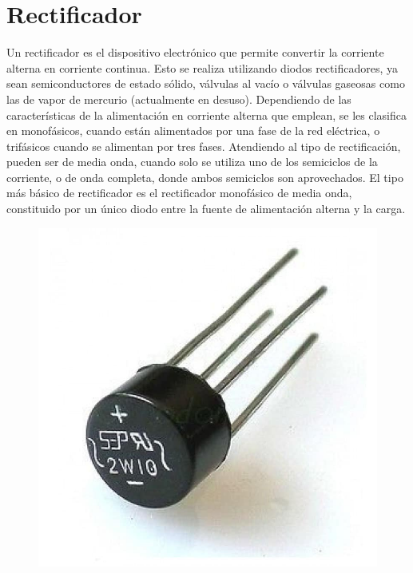\documentclass[a4paper,12pt]{report}
\begin{document}
\section{Rectificador}
Un rectificador es el dispositivo electrónico que permite convertir la corriente alterna en corriente continua. Esto se realiza utilizando diodos rectificadores, ya sean semiconductores de estado sólido, válvulas al vacío o válvulas gaseosas como las de vapor de mercurio (actualmente en desuso). Dependiendo de las características de la alimentación en corriente alterna que emplean, se les clasifica en monofásicos, cuando están alimentados por una fase de la red eléctrica, o trifásicos cuando se alimentan por tres fases.
Atendiendo al tipo de rectificación, pueden ser de media onda, cuando solo se utiliza uno de los semiciclos de la corriente, o de onda completa, donde ambos semiciclos son aprovechados. El tipo más básico de rectificador es el rectificador monofásico de media onda, constituido por un único diodo entre la fuente de alimentación alterna y la carga.
\begin{figure}[H]
\centering
\includegraphics[scale=0.2]{rectificador.jpg}
\end{figure}
\end{document}
